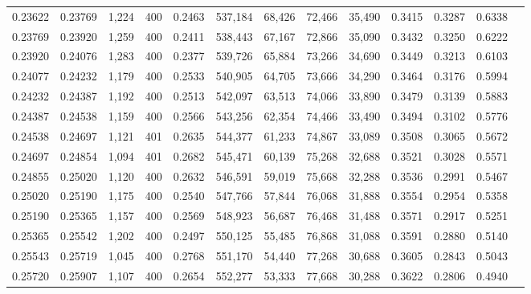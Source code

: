 \begin{tabular}{rrrrrrrrrrrrr}
0.23622 & 0.23769 &  1,224 & 400 &                                     0.2463 & 537,184 &  68,426 &  72,466 &  35,490 & 0.3415 & 0.3287 & 0.6338 \\
0.23769 & 0.23920 &  1,259 & 400 &                                     0.2411 & 538,443 &  67,167 &  72,866 &  35,090 & 0.3432 & 0.3250 & 0.6222 \\
0.23920 & 0.24076 &  1,283 & 400 &                                     0.2377 & 539,726 &  65,884 &  73,266 &  34,690 & 0.3449 & 0.3213 & 0.6103 \\
0.24077 & 0.24232 &  1,179 & 400 &                                     0.2533 & 540,905 &  64,705 &  73,666 &  34,290 & 0.3464 & 0.3176 & 0.5994 \\
0.24232 & 0.24387 &  1,192 & 400 &                                     0.2513 & 542,097 &  63,513 &  74,066 &  33,890 & 0.3479 & 0.3139 & 0.5883 \\
0.24387 & 0.24538 &  1,159 & 400 &                                     0.2566 & 543,256 &  62,354 &  74,466 &  33,490 & 0.3494 & 0.3102 & 0.5776 \\
0.24538 & 0.24697 &  1,121 & 401 &                                     0.2635 & 544,377 &  61,233 &  74,867 &  33,089 & 0.3508 & 0.3065 & 0.5672 \\
0.24697 & 0.24854 &  1,094 & 401 &                                     0.2682 & 545,471 &  60,139 &  75,268 &  32,688 & 0.3521 & 0.3028 & 0.5571 \\
0.24855 & 0.25020 &  1,120 & 400 &                                     0.2632 & 546,591 &  59,019 &  75,668 &  32,288 & 0.3536 & 0.2991 & 0.5467 \\
0.25020 & 0.25190 &  1,175 & 400 &                                     0.2540 & 547,766 &  57,844 &  76,068 &  31,888 & 0.3554 & 0.2954 & 0.5358 \\
0.25190 & 0.25365 &  1,157 & 400 &                                     0.2569 & 548,923 &  56,687 &  76,468 &  31,488 & 0.3571 & 0.2917 & 0.5251 \\
0.25365 & 0.25542 &  1,202 & 400 &                                     0.2497 & 550,125 &  55,485 &  76,868 &  31,088 & 0.3591 & 0.2880 & 0.5140 \\
0.25543 & 0.25719 &  1,045 & 400 &                                     0.2768 & 551,170 &  54,440 &  77,268 &  30,688 & 0.3605 & 0.2843 & 0.5043 \\
0.25720 & 0.25907 &  1,107 & 400 &                                     0.2654 & 552,277 &  53,333 &  77,668 &  30,288 & 0.3622 & 0.2806 & 0.4940 \\

\end{tabular}

